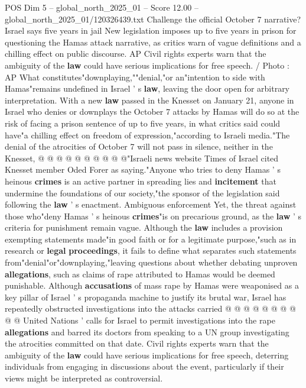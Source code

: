 \begin{textsample}{POS Dim 5 – global\_north\_2025\_01 – Score 12.00 – global\_north\_2025\_01/120326439.txt}  \label{ex:f5_pos_389}
Challenge the official October 7 narrative?
Israel says five years in jail New legislation imposes up to five years in prison for questioning the Hamas attack narrative, as critics warn of vague definitions and a chilling effect on public discourse.
AP Civil rights experts warn that the ambiguity of the \textbf{law} could have serious implications for free speech. / Photo : AP What constitutes"downplaying,""denial,"or an"intention to side with Hamas"remains undefined in Israel ' s \textbf{law}, leaving the door open for arbitrary interpretation.
With a new \textbf{law} passed in the Knesset on January 21, anyone in Israel who denies or downplays the October 7 attacks by Hamas will do so at the risk of facing a prison sentence of up to five years, in what critics said could have"a chilling effect on freedom of expression,"according to Israeli media."The denial of the atrocities of October 7 will not pass in silence, neither in the Knesset, @ @ @ @ @ @ @ @ @ @"Israeli news website Times of Israel cited Knesset member Oded Forer as saying."Anyone who tries to deny Hamas ' s heinous \textbf{crimes} is an active partner in spreading lies and \textbf{incitement} that undermine the foundations of our society,"the sponsor of the legislation said following the \textbf{law} ' s enactment.
Ambiguous enforcement Yet, the threat against those who"deny Hamas ' s heinous \textbf{crimes}"is on precarious ground, as the \textbf{law} ' s criteria for punishment remain vague.
Although the \textbf{law} includes a provision exempting statements made"in good faith or for a legitimate purpose,"such as in research or \textbf{legal} \textbf{proceedings}, it fails to define what separates such statements from"denial"or"downplaying,"leaving questions about whether debating unproven \textbf{allegations}, such as claims of rape attributed to Hamas would be deemed punishable.
Although \textbf{accusations} of mass rape by Hamas were weaponised as a key pillar of Israel ' s propaganda machine to justify its brutal war, Israel has repeatedly obstructed investigations into the attacks carried @ @ @ @ @ @ @ @ @ @ United Nations ' calls for Israel to permit investigations into the rape \textbf{allegations} and barred its doctors from speaking to a UN group investigating the atrocities committed on that date.
Civil rights experts warn that the ambiguity of the \textbf{law} could have serious implications for free speech, deterring individuals from engaging in discussions about the event, particularly if their views might be interpreted as controversial.

\end{textsample}
